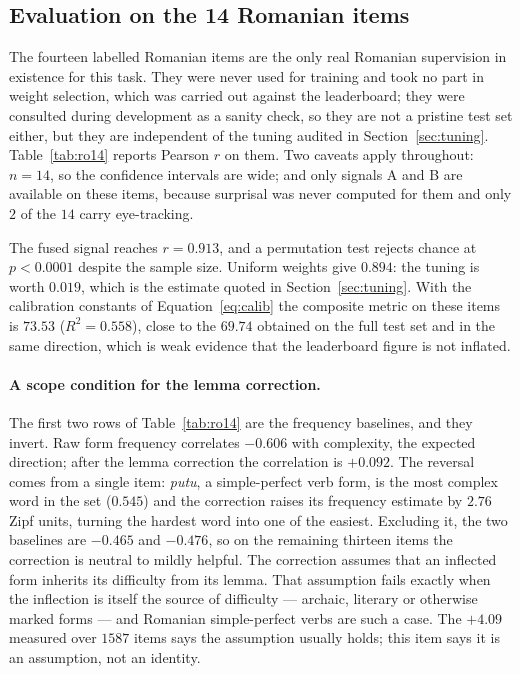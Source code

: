\documentclass[11pt]{article}
\begin{document}
\subsection{Evaluation on the 14 Romanian items}
\label{sec:14items}

The fourteen labelled Romanian items are the only real Romanian
supervision in existence for this task. They were never used for
training and took no part in weight selection, which was carried out
against the leaderboard; they were consulted during development as a
sanity check, so they are not a pristine test set either, but they are
independent of the tuning audited in Section~\ref{sec:tuning}.
Table~\ref{tab:ro14} reports Pearson $r$ on them. Two caveats apply
throughout: $n = 14$, so the confidence intervals are wide; and only
signals A and B are available on these items, because surprisal was
never computed for them and only $2$ of the $14$ carry eye-tracking.

The fused signal reaches $r = 0.913$, and a permutation test rejects
chance at $p < 0.0001$ despite the sample size. Uniform weights give
$0.894$: the tuning is worth $0.019$, which is the estimate quoted in
Section~\ref{sec:tuning}. With the calibration constants of
Equation~\ref{eq:calib} the composite metric on these items is $73.53$
($R^2 = 0.558$), close to the $69.74$ obtained on the full test set and
in the same direction, which is weak evidence that the leaderboard
figure is not inflated.

\paragraph{A scope condition for the lemma correction.}
The first two rows of Table~\ref{tab:ro14} are the frequency baselines,
and they invert. Raw form frequency correlates $-0.606$ with
complexity, the expected direction; after the lemma correction the
correlation is $+0.092$. The reversal comes from a single item:
\emph{putu}, a simple-perfect verb form, is the most complex word in the
set ($0.545$) and the correction raises its frequency estimate by
$2.76$ Zipf units, turning the hardest word into one of the easiest.
Excluding it, the two baselines are $-0.465$ and $-0.476$, so on the
remaining thirteen items the correction is neutral to mildly helpful.
The correction assumes that an inflected form inherits its difficulty
from its lemma. That assumption fails exactly when the inflection is
itself the source of difficulty --- archaic, literary or otherwise
marked forms --- and Romanian simple-perfect verbs are such a case. The
$+4.09$ measured over $1587$ items says the assumption usually holds;
this item says it is an assumption, not an identity.
\end{document}
